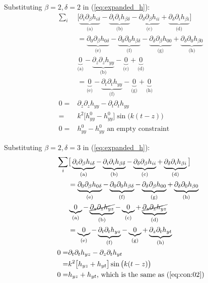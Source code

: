 \documentclass[]{article}
\begin{document}
Substituting $\beta=2,\delta=2$ in (\ref{eq:expanded_h}):
\begin{align*}
	\sum_i&\big[\underbrace{\partial_i\partial_\beta h_{i\delta}}_\text{(a)} - \underbrace{\partial_i\partial_i h_{\beta\delta}}_\text{(b)} -  \underbrace{\partial_\delta\partial_\beta h_{ii}}_\text{(c)} + \underbrace{\partial_\delta\partial_i h_{\beta i}}_\text{(d)}\big]\\
	&=\underbrace{\partial_0\partial_\beta h_{0\delta}}_\text{(e)} - \underbrace{\partial_0\partial_0 h_{\beta\delta}}_\text{(f)} -  \underbrace{\partial_\delta\partial_\beta h_{00}}_\text{(g)} + \underbrace{\partial_\delta\partial_0 h_{\beta 0}}_\text{(h)}\\
	&\underbrace{0}_\text{(a)} - \underbrace{\partial_z\partial_z h_{yy}}_\text{(b)} -  \underbrace{0}_\text{(c)} + \underbrace{0}_\text{(d)}\\
	&=\underbrace{0}_\text{(e)} - \underbrace{\partial_t\partial_t h_{yy}}_\text{(f)} -  \underbrace{0}_\text{(g)} + \underbrace{0}_\text{(h)}\\
	0=&\partial_z\partial_z h_{yy}-\partial_t\partial_t h_{yy}\\
	=&k^2 \big[h^0_{yy}-h^0_{yy}\big] \sin\big(k(t-z)\big) \\
	0=&h^0_{yy}-h^0_{yy} \text{ an empty constraint}
\end{align*}

Substituting $\beta=2,\delta=3$ in (\ref{eq:expanded_h}):
\begin{align*}
	\sum_i&\big[\underbrace{\partial_i\partial_\beta h_{i\delta}}_\text{(a)} - \underbrace{\partial_i\partial_i h_{\beta\delta}}_\text{(b)} -  \underbrace{\partial_\delta\partial_\beta h_{ii}}_\text{(c)} + \underbrace{\partial_\delta\partial_i h_{\beta i}}_\text{(d)}\big]\\
	&=\underbrace{\partial_0\partial_\beta h_{0\delta}}_\text{(e)} - \underbrace{\partial_0\partial_0 h_{\beta\delta}}_\text{(f)} -  \underbrace{\partial_\delta\partial_\beta h_{00}}_\text{(g)} + \underbrace{\partial_\delta\partial_0 h_{\beta 0}}_\text{(h)}\\
	&\underbrace{0}_\text{(a)} - \underbrace{\cancel{\partial_z\partial_z h_{yz}}}_\text{(b)} -  \underbrace{0}_\text{(c)} + \underbrace{\cancel{\partial_z\partial_z h_{yz}}}_\text{(d)}\\
	&=\underbrace{0}_\text{(e)} - \underbrace{\partial_t\partial_t h_{yz}}_\text{(f)} -  \underbrace{0}_\text{(g)} + \underbrace{\partial_z\partial_t h_{yt}}_\text{(h)}\\
	0=&\partial_t\partial_t h_{yz}-\partial_z\partial_t h_{yt}\\
	=&k^2 \big[ h_{yz}+h_{yt}\big] \sin\big(k(t-z)\big) \\
	0=&  h_{yz}+h_{yt} \text{, which is the same as (\ref{eq:con:02})}
\end{align*}
\end{document}
